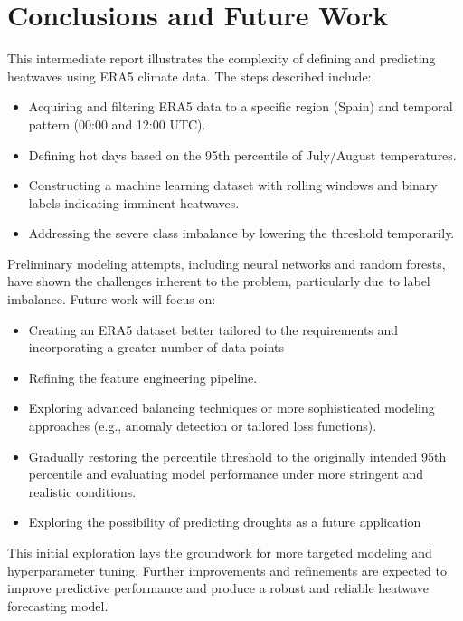\documentclass[12pt,a4paper]{article}
\begin{document}
\section{Conclusions and Future Work}
This intermediate report illustrates the complexity of defining and predicting heatwaves using ERA5 climate data. The steps described include:
\begin{itemize}
    \item Acquiring and filtering ERA5 data to a specific region (Spain) and temporal pattern (00:00 and 12:00 UTC).
    \item Defining hot days based on the 95th percentile of July/August temperatures.
    \item Constructing a machine learning dataset with rolling windows and binary labels indicating imminent heatwaves.
    \item Addressing the severe class imbalance by lowering the threshold temporarily.
\end{itemize}

Preliminary modeling attempts, including neural networks and random forests, have shown the challenges inherent to the problem, particularly due to label imbalance. Future work will focus on:
\begin{itemize}
	\item Creating an ERA5 dataset better tailored to the requirements and incorporating a greater number of data points
    \item Refining the feature engineering pipeline.
    \item Exploring advanced balancing techniques or more sophisticated modeling approaches (e.g., anomaly detection or tailored loss functions).
    \item Gradually restoring the percentile threshold to the originally intended 95th percentile and evaluating model performance under more stringent and realistic conditions.
    \item Exploring the possibility of predicting droughts as a future application
\end{itemize}

This initial exploration lays the groundwork for more targeted modeling and hyperparameter tuning. Further improvements and refinements are expected to improve predictive performance and produce a robust and reliable heatwave forecasting model.
\end{document}
